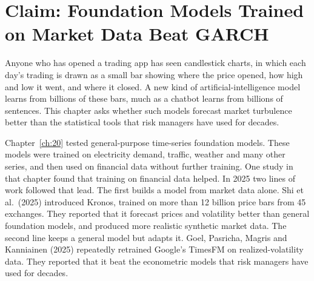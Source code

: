 \makeatletter
{}
\makeatother

\makeatletter
\makeatother

\chapter{Claim: Foundation Models Trained on Market Data Beat GARCH}
\label{ch:22}

Anyone who has opened a trading app has seen candlestick charts, in which each day's trading is drawn as a small bar showing where the price opened, how high and low it went, and where it closed. A new kind of artificial-intelligence model learns from billions of these bars, much as a chatbot learns from billions of sentences. This chapter asks whether such models forecast market turbulence better than the statistical tools that risk managers have used for decades.

Chapter~\ref{ch:20} tested general-purpose time-series foundation models. These models were trained on electricity demand, traffic, weather and many other series, and then used on financial data without further training. One study in that chapter found that training on financial data helped. In 2025 two lines of work followed that lead. The first builds a model from market data alone. Shi et al.\ (2025) introduced Kronos, trained on more than 12 billion price bars from 45 exchanges. They reported that it forecast prices and volatility better than general foundation models, and produced more realistic synthetic market data. The second line keeps a general model but adapts it. Goel, Pasricha, Magris and Kanniainen (2025) repeatedly retrained Google's TimesFM on realized-volatility data. They reported that it beat the econometric models that risk managers have used for decades.

